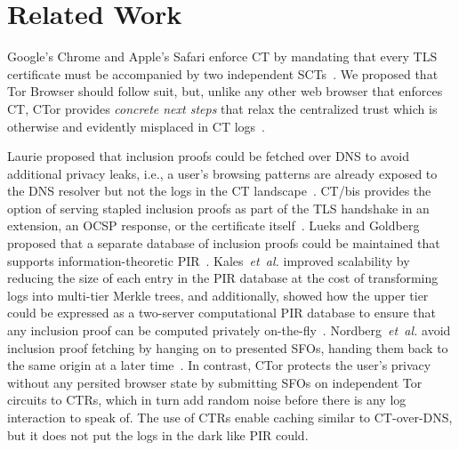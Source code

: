\section{Related Work} \label{sec:related}
Google's Chrome and Apple's Safari enforce CT by mandating that every TLS
certificate must be accompanied by two independent
SCTs~\cite{chrome-policy,safari-policy}.  We proposed that Tor Browser should
follow suit, but, unlike any other web browser that enforces CT, CTor provides
\emph{concrete next steps} that relax the centralized trust which is otherwise
and evidently misplaced in CT logs~\cite{%
	izenpe-disqualified,%
	venafi-disqualified,%
	gdca1-omission,%
	digicert-log-compromised%
}.

Laurie proposed that inclusion proofs could be fetched over DNS to avoid
additional privacy leaks, i.e., a user's browsing patterns are already exposed
to the DNS resolver but not the logs in the CT landscape~\cite{ct-over-dns}.
CT/bis provides the option of serving stapled inclusion proofs as part of the
TLS handshake in an extension, an OCSP response, or the certificate
itself~\cite{ct/bis}.
Lueks and Goldberg proposed that a separate database of inclusion proofs could
be maintained that supports information-theoretic PIR~\cite{lueks-and-goldberg}.
Kales~\emph{et~al.} improved scalability by reducing the size of each entry
in the PIR database at the cost of transforming logs into multi-tier Merkle
trees, and additionally, showed how the upper tier could be expressed as
a two-server computational PIR database to ensure that any inclusion proof can
be computed privately on-the-fly~\cite{kales}.
Nordberg~\emph{et~al.} avoid inclusion proof fetching by hanging on to presented
SFOs, handing them back to the same origin at a later time~\cite{nordberg}.
In contrast, CTor protects the user's privacy without any persited browser state
by submitting SFOs on independent Tor circuits to CTRs, which in turn add random
noise before there is any log interaction to speak of.  The use of CTRs
enable caching similar to CT-over-DNS, but it does not put the logs in the dark
like PIR could.

